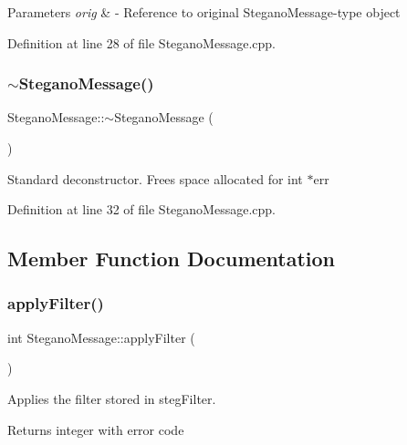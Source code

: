 \begin{DoxyParams}{Parameters}
{\em orig} & -\/ Reference to original Stegano\+Message-\/type object \\
\hline
\end{DoxyParams}


Definition at line 28 of file Stegano\+Message.\+cpp.

\mbox{\label{classSteganoMessage_af60430fa53ebe9ee44e60d906b67059d}} 
\subsubsection{\texorpdfstring{$\sim$SteganoMessage()}{~SteganoMessage()}}
{\footnotesize\ttfamily Stegano\+Message\+::$\sim$\+Stegano\+Message (\begin{DoxyParamCaption}{ }\end{DoxyParamCaption})\hspace{0.3cm}{\ttfamily [virtual]}}

Standard deconstructor. Frees space allocated for int $\ast$err 

Definition at line 32 of file Stegano\+Message.\+cpp.



\subsection{Member Function Documentation}
\mbox{\label{classSteganoMessage_aec575d6949cf2eb49adefe2f1299d075}} 
\subsubsection{\texorpdfstring{applyFilter()}{applyFilter()}}
{\footnotesize\ttfamily int Stegano\+Message\+::apply\+Filter (\begin{DoxyParamCaption}{ }\end{DoxyParamCaption})}



Applies the filter stored in steg\+Filter. 

\begin{DoxyReturn}{Returns}
integer with error code 
\end{DoxyReturn}



